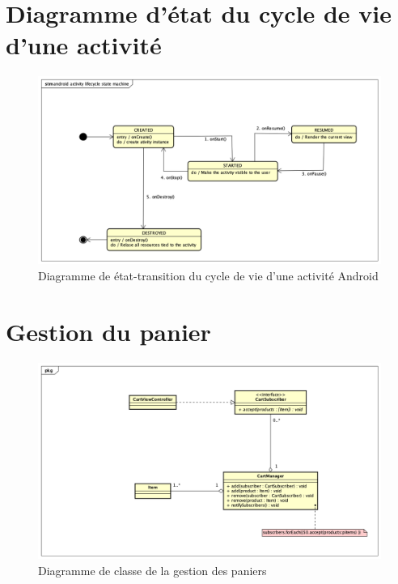 \section{Diagramme d'état du cycle de vie d'une activité}
\begin{figure}[H]
	\centering
	\includegraphics[scale=0.5]{assets/images/android_lifecycle_state_machine.png}
	\caption{Diagramme de état-transition du cycle de vie d'une activité Android}
	\label{fig.android_state}
\end{figure}
\section{Gestion du panier}
\begin{figure}[H]
	\centering
	\includegraphics[scale=0.45]{assets/images/cart_management.png}
	\caption{Diagramme de classe de la gestion des paniers}
	\label{fig.android_cart_man}
\end{figure}
